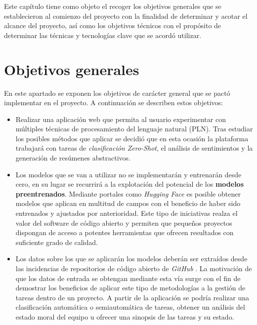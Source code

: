 
Este capítulo tiene como objeto el recoger los objetivos generales que se establecieron al comienzo del proyecto con la finalidad de determinar y acotar el alcance del proyecto, así como los objetivos técnicos con el propósito de determinar las técnicas y tecnologías clave que se acordó utilizar.

\section{Objetivos generales}

En este apartado se exponen los objetivos de carácter general que se pactó implementar en el proyecto. A continuación se describen estos objetivos:

\begin{itemize} [\textbullet]

\item Realizar una aplicación web que permita al usuario experimentar con múltiples técnicas de procesamiento del lenguaje natural (PLN). Tras estudiar los posibles métodos que aplicar se decidió que en esta ocasión la plataforma trabajará con tareas de \emph{clasificación Zero-Shot}, el análisis de sentimientos y la generación de resúmenes abstractivos.

\item Los modelos que se van a utilizar no se implementarán y entrenarán desde cero, en su lugar se recurrirá a la explotación del potencial de los \textbf{modelos preentrenados}. Mediante portales como \emph{Hugging Face} \cite{platform:hugging_face} es posible obtener modelos que aplican en multitud de campos con el beneficio de haber sido entrenados y ajustados por anterioridad. Este tipo de iniciativas realza el valor del software de código abierto y permiten que pequeños proyectos dispongan de acceso a potentes herramientas que ofrecen resultados con suficiente grado de calidad.

\item Los datos sobre los que se aplicarán los modelos deberán ser extraídos desde las incidencias de repositorios de código abierto de \emph{GitHub} \cite{platform:github}. La motivación de que los datos de entrada se obtengan mediante esta vía surge con el fin de demostrar los beneficios de aplicar este tipo de metodologías a la gestión de tareas dentro de un proyecto. A partir de la aplicación se podría realizar una clasificación automática o semiautomática de tareas, obtener un análisis del estado moral del equipo u ofrecer una sinopsis de las tareas y su estado.


\end{itemize}
